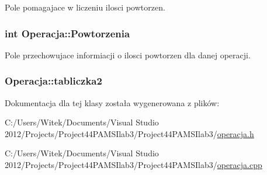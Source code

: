 Pole pomagajace w liczeniu ilosci powtorzen. 

\hypertarget{class_operacja_aa568b17d05f31132b3d97eb5b7e93d61}{
\subsubsection[{Powtorzenia}]{\setlength{\rightskip}{0pt plus 5cm}int Operacja\-::\-Powtorzenia}}\label{class_operacja_aa568b17d05f31132b3d97eb5b7e93d61}


Pole przechowujace informiacji o ilosci powtorzen dla danej operacji. 

\hypertarget{class_operacja_abf2eb42f0b32b1528939aa39e0ebd528}{
\subsubsection[{tabliczka2}]{ Operacja\-::tabliczka2}}\label{class_operacja_abf2eb42f0b32b1528939aa39e0ebd528}


Dokumentacja dla tej klasy została wygenerowana z plików\-:\begin{DoxyCompactItemize}
\item 
C\-:/\-Users/\-Witek/\-Documents/\-Visual Studio 2012/\-Projects/\-Project44\-P\-A\-M\-S\-Ilab3/\-Project44\-P\-A\-M\-S\-Ilab3/\hyperlink{operacja_8h}{operacja.\-h}\item 
C\-:/\-Users/\-Witek/\-Documents/\-Visual Studio 2012/\-Projects/\-Project44\-P\-A\-M\-S\-Ilab3/\-Project44\-P\-A\-M\-S\-Ilab3/\hyperlink{operacja_8cpp}{operacja.\-cpp}\end{DoxyCompactItemize}
